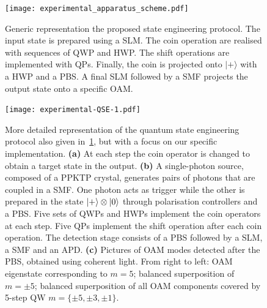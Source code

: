 
\begin{figure}[tb]
\centering
\texttt{[image: experimental\_apparatus\_scheme.pdf]}
\caption{
    Generic representation the proposed state engineering protocol.
    The input state is prepared using a \ac{SLM}.
    The coin operation are realised with sequences of \ac{QWP} and \ac{HWP}.
    The shift operations are implemented with QPs.
    Finally, the coin is projected onto $\vert + \rangle$ with a \ac{HWP} and a \ac{PBS}.
    A final \ac{SLM} followed by a \ac{SMF} projects the output state onto a specific OAM.
}
\label{fig:expQWs:proposal_exp}
\end{figure}

\begin{figure}[tb]
\texttt{[image: experimental-QSE-1.pdf]}
\caption{
	More detailed representation of the quantum state engineering protocol also given in~\cref{fig:expQWs:proposal_exp}, but with a focus on our specific implementation.
	\textbf{(a)} At each step the coin operator is changed to obtain a target state in the output.
	\textbf{(b)} A single-photon source, composed of a \ac{PPKTP} crystal, generates pairs of photons that are coupled in a SMF. One photon acts as trigger while the other is prepared in the state $\ket{+}\otimes \ket{0}$ through polarisation controllers and a \ac{PBS}. Five sets of \acp{QWP} and \acp{HWP} implement the coin operators at each step. Five \acp{QP} implement the shift operation after each coin operation.
	The detection stage consists of a \ac{PBS} followed by a \ac{SLM}, a \ac{SMF} and an \ac{APD}.
	\textbf{(c)} Pictures of \ac{OAM} modes detected after the \ac{PBS}, obtained using coherent light. From right to left: \ac{OAM} eigenstate corresponding to $m=5$; balanced superposition of $m=\pm 5$; balanced superposition of all \ac{OAM} components covered by 5-step \ac{QW} $m=\{\pm 5, \pm 3, \pm 1\}$.
}
\label{fig:expQWs:schematics}
\end{figure}

